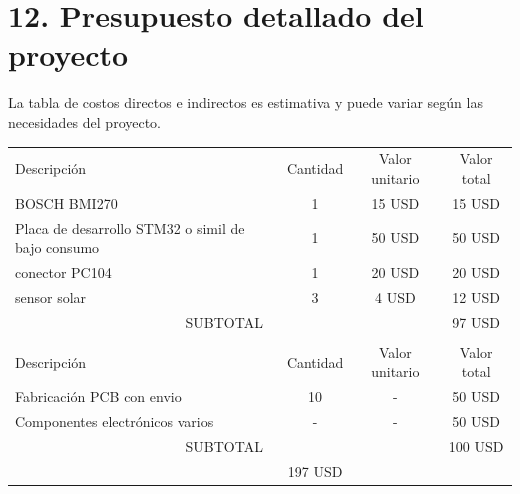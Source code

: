 \documentclass[
11pt, %
]{charter}
\begin{document}
\section{12. Presupuesto detallado del proyecto}
\label{sec:presupuesto}

La tabla de costos directos e indirectos es estimativa y puede variar según las necesidades del proyecto. 

\begin{table}[htpb]
\centering
\begin{tabularx}{\linewidth}{@{}|X|c|r|r|@{}}
\hline
\rowcolor[HTML]{C0C0C0} 
\multicolumn{4}{|c|}{\cellcolor[HTML]{C0C0C0}COSTOS DIRECTOS} \\ \hline
\rowcolor[HTML]{C0C0C0} 
Descripción &
  \multicolumn{1}{c|}{\cellcolor[HTML]{C0C0C0}Cantidad} &
  \multicolumn{1}{c|}{\cellcolor[HTML]{C0C0C0}Valor unitario} &
  \multicolumn{1}{c|}{\cellcolor[HTML]{C0C0C0}Valor total} \\ \hline
 BOSCH BMI270 & 
  \multicolumn{1}{c|}{1} &
  \multicolumn{1}{c|}{15 USD} &
  \multicolumn{1}{c|}{15 USD} \\ \hline
 Placa de desarrollo STM32 o simil de bajo consumo&
  \multicolumn{1}{c|}{1} &
  \multicolumn{1}{c|}{50 USD} &
  \multicolumn{1}{c|}{50 USD} \\ \hline
conector PC104 & 1	 
   & \multicolumn{1}{c|}{20 USD}
   & \multicolumn{1}{c|}{20 USD}
   \\ \hline
sensor solar & 3  
   & \multicolumn{1}{c|}{4 USD} 
   & \multicolumn{1}{c|}{12 USD} 
   \\ \hline
\multicolumn{3}{|c|}{SUBTOTAL} & 
\multicolumn{1}{c|}{97 USD} \\ \hline
\rowcolor[HTML]{C0C0C0} 
\multicolumn{4}{|c|}{\cellcolor[HTML]{C0C0C0}COSTOS INDIRECTOS} \\ \hline
\rowcolor[HTML]{C0C0C0} 
Descripción &
  \multicolumn{1}{c|}{\cellcolor[HTML]{C0C0C0}Cantidad} &
  \multicolumn{1}{c|}{\cellcolor[HTML]{C0C0C0}Valor unitario} &
  \multicolumn{1}{c|}{\cellcolor[HTML]{C0C0C0}Valor total} \\ \hline
Fabricación PCB con envio & \multicolumn{1}{c|}{10} 
   & \multicolumn{1}{c|}{-} 
   & \multicolumn{1}{c|}{50 USD} 
   \\ \hline
Componentes electrónicos varios  & \multicolumn{1}{c|}{-}
   &\multicolumn{1}{c|}{-}
   &\multicolumn{1}{c|}{50 USD}
   \\ \hline
\multicolumn{3}{|c|}{SUBTOTAL} &
  \multicolumn{1}{c|}{100 USD} \\ \hline
\rowcolor[HTML]{C0C0C0}
\multicolumn{3}{|c|}{TOTAL} & 197 USD
   \\ \hline
\end{tabularx}%
\end{table}
\end{document}
